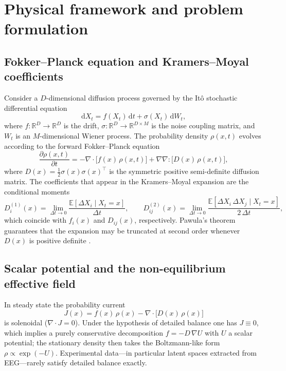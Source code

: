 \documentclass[11pt,a4paper]{article}
\newcommand{\R}{\mathbb{R}}
\newcommand{\dd}{\mathrm{d}}
\newcommand{\topT}{^{\top}}
\newcommand{\grad}{\nabla}
\newcommand{\Div}{\nabla\!\cdot\!}
\newcommand{\Drift}{D^{(1)}}
\newcommand{\Diff}{D^{(2)}}
\begin{document}
\section{Physical framework and problem formulation}

\subsection{Fokker--Planck equation and Kramers--Moyal coefficients}

Consider a $D$-dimensional diffusion process governed by the It\^o stochastic
differential equation
\begin{equation}
\dd X_t = f(X_t)\,\dd t + \sigma(X_t)\,\dd W_t,
\label{eq:sde}
\end{equation}
where $f:\R^D \to \R^D$ is the drift, $\sigma:\R^D \to \R^{D\times M}$ is the
noise coupling matrix, and $W_t$ is an $M$-dimensional Wiener process. The
probability density $\rho(x,t)$ evolves according to the forward
Fokker--Planck equation \cite{risken1989,gardiner2009}
\begin{equation}
\frac{\partial \rho(x,t)}{\partial t}
= -\Div \big[ f(x)\,\rho(x,t) \big]
+ \grad\grad : \big[ D(x)\,\rho(x,t) \big],
\label{eq:fpe}
\end{equation}
where $D(x) = \tfrac{1}{2}\sigma(x)\sigma(x)\topT$ is the symmetric positive
semi-definite diffusion matrix. The coefficients that appear in the
Kramers--Moyal expansion are the conditional moments
\begin{equation}
\Drift_i(x) = \lim_{\Delta t \to 0}
\frac{\mathbb{E}[\Delta X_i \mid X_t = x]}{\Delta t},
\qquad
\Diff_{ij}(x) = \lim_{\Delta t \to 0}
\frac{\mathbb{E}[\Delta X_i\, \Delta X_j \mid X_t = x]}{2\,\Delta t},
\label{eq:km_moments}
\end{equation}
which coincide with $f_i(x)$ and $D_{ij}(x)$, respectively. Pawula's theorem
guarantees that the expansion may be truncated at second order whenever $D(x)$
is positive definite \cite{risken1989}.

\subsection{Scalar potential and the non-equilibrium effective field}

In steady state the probability current
\begin{equation}
J(x) = f(x)\,\rho(x) - \Div \big[ D(x)\,\rho(x) \big]
\label{eq:current}
\end{equation}
is solenoidal ($\Div J = 0$). Under the hypothesis of detailed balance one has
$J \equiv 0$, which implies a purely conservative decomposition $f = -D\,\grad
U$ with $U$ a scalar potential; the stationary density then takes the
Boltzmann-like form $\rho \propto \exp(-U)$. Experimental data---in particular
latent spaces extracted from EEG---rarely satisfy detailed balance exactly.
\end{document}

